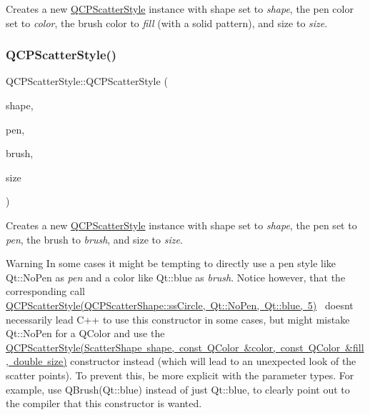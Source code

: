 Creates a new \mbox{\hyperlink{class_q_c_p_scatter_style}{Q\+C\+P\+Scatter\+Style}} instance with shape set to {\itshape shape}, the pen color set to {\itshape color}, the brush color to {\itshape fill} (with a solid pattern), and size to {\itshape size}. \mbox{\label{class_q_c_p_scatter_style_a85acc4941d7e5c9bca5fa51377a77f49}} 
\subsubsection{\texorpdfstring{QCPScatterStyle()}{QCPScatterStyle()}\hspace{0.1cm}{\footnotesize\ttfamily [5/7]}}
{\footnotesize\ttfamily Q\+C\+P\+Scatter\+Style\+::\+Q\+C\+P\+Scatter\+Style (\begin{DoxyParamCaption}\item[{\mbox{\hyperlink{class_q_c_p_scatter_style_adb31525af6b680e6f1b7472e43859349}{Scatter\+Shape}}}]{shape,  }\item[{const Q\+Pen \&}]{pen,  }\item[{const Q\+Brush \&}]{brush,  }\item[{double}]{size }\end{DoxyParamCaption})}

Creates a new \mbox{\hyperlink{class_q_c_p_scatter_style}{Q\+C\+P\+Scatter\+Style}} instance with shape set to {\itshape shape}, the pen set to {\itshape pen}, the brush to {\itshape brush}, and size to {\itshape size}.

\begin{DoxyWarning}{Warning}
In some cases it might be tempting to directly use a pen style like {\ttfamily Qt\+::\+No\+Pen} as {\itshape pen} and a color like {\ttfamily Qt\+::blue} as {\itshape brush}. Notice however, that the corresponding call~\newline
{\ttfamily \mbox{\hyperlink{class_q_c_p_scatter_style}{Q\+C\+P\+Scatter\+Style(\+Q\+C\+P\+Scatter\+Shape\+::ss\+Circle, Qt\+::\+No\+Pen, Qt\+::blue, 5)}}}~\newline
doesn\textquotesingle{}t necessarily lead C++ to use this constructor in some cases, but might mistake {\ttfamily Qt\+::\+No\+Pen} for a Q\+Color and use the \mbox{\hyperlink{class_q_c_p_scatter_style_a6e1b64f12cac7f07af180ae4316fd38d}{Q\+C\+P\+Scatter\+Style(\+Scatter\+Shape shape, const Q\+Color \&color, const Q\+Color \&fill, double size)}} constructor instead (which will lead to an unexpected look of the scatter points). To prevent this, be more explicit with the parameter types. For example, use {\ttfamily Q\+Brush(\+Qt\+::blue)} instead of just {\ttfamily Qt\+::blue}, to clearly point out to the compiler that this constructor is wanted. 
\end{DoxyWarning}
\mbox{\label{class_q_c_p_scatter_style_a63962094587a4c2258435aa7933996cc}} 
